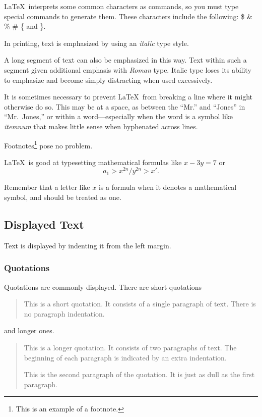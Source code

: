 \LaTeX\ interprets some common characters as commands, so you must type special
commands to generate them. These characters include the following: \$ \& \% \#
\{ and \}.


In printing, text is emphasized by using an {\em italic\/} type style.


\begin{em}
  A long segment of text can also be emphasized in this way. Text within such a
  segment given additional emphasis with\/ {\em Roman} type. Italic type loses
  its ability to emphasize and become simply distracting when used excessively.
\end{em}


It is sometimes necessary to prevent \LaTeX\ from breaking a line where it
might otherwise do so. This may be at a space, as between the ``Mr.'' and
``Jones'' in ``Mr.~Jones,'' or within a word---especially when the word is a
symbol like \mbox{\em itemnum\/} that makes little sense when hyphenated across
lines.


Footnotes\footnote{This is an example of a footnote.} pose no problem.


\LaTeX\ is good at typesetting mathematical formulas like $ x-3y = 7 $ or
\[
  a_{1} > x^{2n} / y^{2n} > x'.
\]


Remember that a letter like $x$ is a formula when it denotes a mathematical
symbol, and should be treated as one.


\subsection{Displayed Text}


Text is displayed by indenting it from the left margin.


\subsubsection{Quotations}


Quotations are commonly displayed. There are short quotations
\begin{quote}
  This is a short quotation. It consists of a single paragraph of text. There
  is no paragraph indentation.
\end{quote}
and longer ones.
\begin{quotation}
  This is a longer quotation. It consists of two paragraphs of text. The
  beginning of each paragraph is indicated by an extra indentation.


  This is the second paragraph of the quotation. It is just as dull as the
  first paragraph.
\end{quotation}


